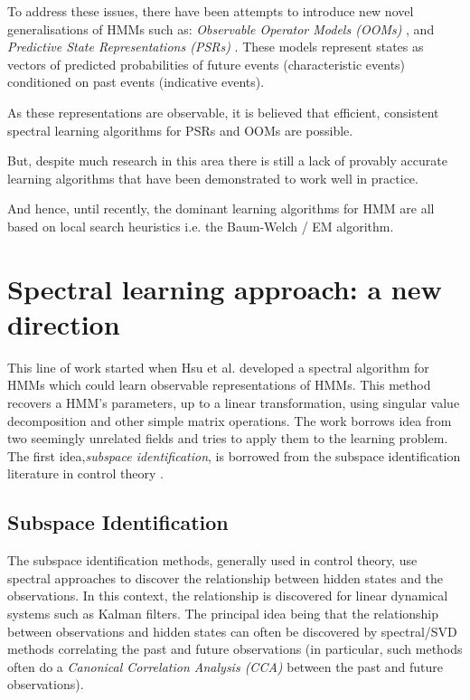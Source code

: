To address these issues, there have been attempts to introduce new novel generalisations of HMMs such as: \textit{Observable Operator Models
(OOMs)} \cite{ref9}, and \textit{Predictive State Representations
(PSRs)} \cite{ref10}. These models represent states as vectors of predicted probabilities of future events (characteristic events) conditioned on past events (indicative
events). 

As these representations are observable, it is believed that efficient, consistent spectral
learning algorithms for PSRs and OOMs are possible. 

But, despite much research in this area there is still a lack of provably accurate learning algorithms that have been demonstrated to work well in practice.

And hence, until recently, the dominant learning algorithms for HMM are all based on local search heuristics i.e. the Baum-Welch / EM algorithm.


\section{Spectral learning approach: a new direction}

This line of work started when Hsu et al.\cite{ref2}
developed a spectral algorithm for HMMs which could learn observable representations of HMMs. This method recovers a HMM’s parameters, up to a linear transformation, using singular value decomposition and other simple matrix operations.
\newline
\newline
The work borrows idea from two seemingly unrelated fields and tries to apply them to the learning problem.
\newline
\newline
The first idea,\textit{subspace identification}, is borrowed from the subspace identification literature in control theory \cite{ref12} \cite{ref13}. 
\newline
\subsection{Subspace Identification}

The subspace identification methods, generally used in control theory, use spectral approaches to discover the relationship between hidden states and the observations. In this context, the relationship is
discovered for linear dynamical systems such as Kalman filters. The principal idea being that the relationship between observations and hidden states can often be discovered by spectral/SVD methods correlating the past and future observations (in particular, such methods often do a \textit{Canonical
Correlation Analysis (CCA)}\cite{ref14} between the past and future observations).

